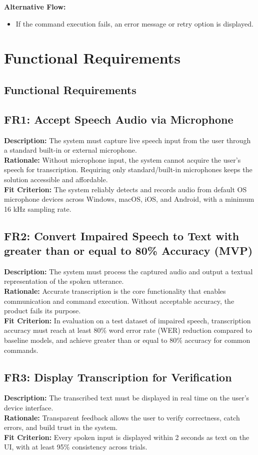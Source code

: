 \documentclass[11pt]{article}
\begin{document}
\textbf{Alternative Flow:}
\begin{itemize}
  \item If the command execution fails, an error message or retry option is displayed.
\end{itemize}


\section{Functional Requirements}
\subsection{Functional Requirements}

\subsection{FR1: Accept Speech Audio via Microphone}
\textbf{Description:} The system must capture live speech input from the user through a standard built-in or external microphone.\\
\textbf{Rationale:} Without microphone input, the system cannot acquire the user’s speech for transcription. Requiring only standard/built-in microphones keeps the solution accessible and affordable.\\
\textbf{Fit Criterion:} The system reliably detects and records audio from default OS microphone devices across Windows, macOS, iOS, and Android, with a minimum 16 kHz sampling rate.

\bigskip
\subsection{FR2: Convert Impaired Speech to Text with greater than or equal to 80\% Accuracy (MVP)}
\textbf{Description:} The system must process the captured audio and output a textual representation of the spoken utterance.\\
\textbf{Rationale:} Accurate transcription is the core functionality that enables communication and command execution. Without acceptable accuracy, the product fails its purpose.\\
\textbf{Fit Criterion:} In evaluation on a test dataset of impaired speech, transcription accuracy must reach at least 80\% word error rate (WER) reduction compared to baseline models, and achieve greater than or equal to 80\% accuracy for common commands.

\bigskip
\subsection{FR3: Display Transcription for Verification}
\textbf{Description:} The transcribed text must be displayed in real time on the user’s device interface.\\
\textbf{Rationale:} Transparent feedback allows the user to verify correctness, catch errors, and build trust in the system.\\
\textbf{Fit Criterion:} Every spoken input is displayed within 2 seconds as text on the UI, with at least 95\% consistency across trials.
\end{document}
